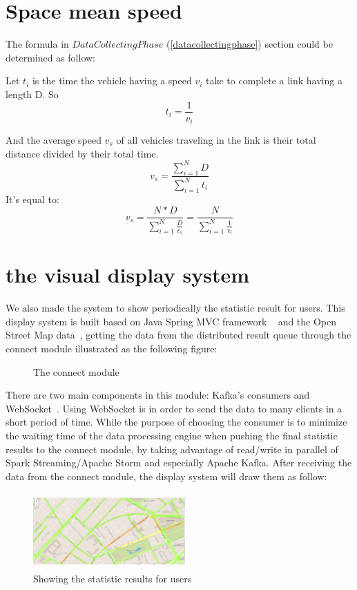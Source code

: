 \documentclass{acm_proc_article-sp}
\begin{document}
\section{Space mean speed}
The formula in $Data Collecting Phase$ (\ref{datacollectingphase}) section could be determined as follow:

Let $t_{i}$ is the time the vehicle having a speed $v_{i}$ take to complete a link having a length D. So
	\[ t_{i} = \frac{1}{v_{i}} \] 

And the average speed $v_{s}$ of all vehicles traveling in the link is their total distance divided by their total time.
	\[v_{s} = \frac{\sum_{i=1}^{N} D}{\sum_{i=1}^{N} t_{i}}\]
It's equal to:
	\[v_{s} = \frac{N \ast D}{\sum_{i=1}^{N} \frac{D}{v_{i}}} = \frac{N}{\sum_{i=1}^{N}\frac{1}{v_{i}}} \]

\section{the visual display system}

We also made the system to show periodically the statistic result for users. This display system is built based on Java Spring MVC framework ~\cite{javaspringmvc} and the Open Street Map data~\cite{openstreetmap}, getting the data from the distributed result queue through the connect module illustrated as the following figure:

\begin{figure}[h]
	\centering
	\caption{The connect module}
	\label{fig:connectmodule}
\end{figure}

There are two main components in this module: Kafka's consumers and WebSocket~\cite{websocket}. Using WebSocket is in order to send the data to many clients in a short period of time. While the purpose of choosing the consumer is to minimize the waiting time of the data processing engine when pushing the final statistic results to the connect module, by taking advantage of read/write in parallel of Spark Streaming/Apache Storm and especially Apache Kafka. After receiving the data from the connect module, the display system will draw them as follow:

	\begin{figure}[h]
		\centering
		\includegraphics[height=110px,width=220px]{Picture1}
		\caption{Showing the statistic results for users}
	\end{figure}
\end{document}
